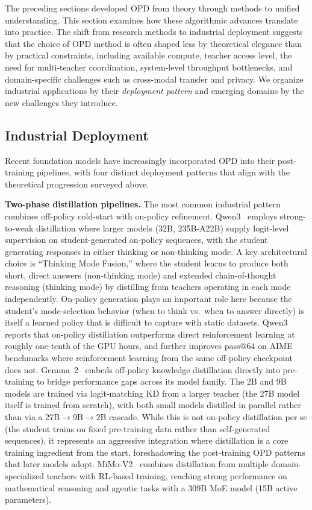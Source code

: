 \documentclass{article} %
\begin{document}
The preceding sections developed OPD from theory through methods to unified understanding. This section examines how these algorithmic advances translate into practice. The shift from research methods to industrial deployment suggests that the choice of OPD method is often shaped less by theoretical elegance than by practical constraints, including available compute, teacher access level, the need for multi-teacher coordination, system-level throughput bottlenecks, and domain-specific challenges such as cross-modal transfer and privacy. We organize industrial applications by their \emph{deployment pattern} and emerging domains by the new challenges they introduce.

\subsection{Industrial Deployment}
\label{subsec:industrial}

Recent foundation models have increasingly incorporated OPD into their post-training pipelines, with four distinct deployment patterns that align with the theoretical progression surveyed above.

\textbf{Two-phase distillation pipelines.} The most common industrial pattern combines off-policy cold-start with on-policy refinement. Qwen3~\citep{2505.09388} employs strong-to-weak distillation where larger models (32B, 235B-A22B) supply logit-level supervision on student-generated on-policy sequences, with the student generating responses in either thinking or non-thinking mode. A key architectural choice is ``Thinking Mode Fusion,'' where the student learns to produce both short, direct answers (non-thinking mode) and extended chain-of-thought reasoning (thinking mode) by distilling from teachers operating in each mode independently. On-policy generation plays an important role here because the student's mode-selection behavior (when to think vs.\ when to answer directly) is itself a learned policy that is difficult to capture with static datasets. Qwen3 reports that on-policy distillation outperforms direct reinforcement learning at roughly one-tenth of the GPU hours, and further improves pass@64 on AIME benchmarks where reinforcement learning from the same off-policy checkpoint does not. Gemma~2~\citep{2408.00118} embeds off-policy knowledge distillation directly into pre-training to bridge performance gaps across its model family. The 2B and 9B models are trained via logit-matching KD from a larger teacher (the 27B model itself is trained from scratch), with both small models distilled in parallel rather than via a 27B$\to$9B$\to$2B cascade. While this is not on-policy distillation per se (the student trains on fixed pre-training data rather than self-generated sequences), it represents an aggressive integration where distillation is a core training ingredient from the start, foreshadowing the post-training OPD patterns that later models adopt. MiMo-V2~\citep{2601.02780} combines distillation from multiple domain-specialized teachers with RL-based training, reaching strong performance on mathematical reasoning and agentic tasks with a 309B MoE model (15B active parameters).
\end{document}
